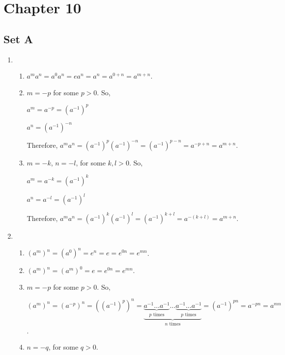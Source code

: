 \section{Chapter 10}
\subsection{Set A}
\begin{enumerate}
    \item
        \begin{enumerate}
            \item $ a^ma^n = a^0a^n = ea^n  = a^n = a^{0 + n} = a^{m + n} $.
            
            \item $ m = -p $ for some $  p > 0 $. So,

            $ a^m = a^{-p} = (a^{-1})^p $

            $ a^n = (a^{-1})^{-n} $

            Therefore, $ a^ma^n = (a^{-1})^p(a^{-1})^{-n} = (a^{-1})^{p - n} = a^{-p + n} = a^{m + n} $.

            \item $ m = -k $, $ n = -l $, for some $ k, l > 0 $. So,

            $ a^m = a^{-k} = (a^{-1})^k $

            $ a^n = a^{-l} = (a^{-1})^l $

            Therefore, $ a^ma^n = (a^{-1})^k(a^{-1})^l = (a^{-1})^{k + l} = a^{-(k + l)} = a^{m + n} $.
        \end{enumerate}

    \item
        \begin{enumerate}
            \item $ (a^m)^n = (a^0)^n = e^n = e = e^{0n} = e^{mn} $.

            \item $ (a^m)^n = (a^m)^0 = e = e^{0n} = e^{mn} $.

            \item $ m = -p $ for some $  p > 0 $. So,
            
            $ (a^{m})^n = (a^{-p})^n = ((a^{-1})^p)^n = \underbrace{\underbrace{a^{-1}\ldots a^{-1}}_{\text{$p$ times}}\ldots \underbrace{a^{-1}\ldots a^{-1}}_{\text{$p$ times}}}_{\text{$n$ times}} = (a^{-1})^{pn} = a^{-pn} = a^{mn} $.

            \item $ n = -q $, for some $ q > 0 $.
            

\end{enumerate}
\end{enumerate}
